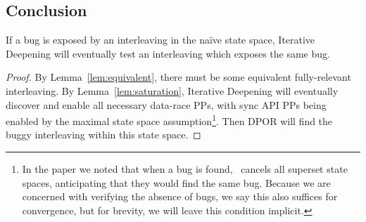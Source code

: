 
\subsection{Conclusion}

\setcounter{theorem}{1}
\begin{theorem}
	If a bug is exposed by an interleaving in the na\"{i}ve state space, Iterative Deepening will eventually test an interleaving which exposes the same bug.
\end{theorem}

\begin{proof}
By Lemma~\ref{lem:equivalent}, there must be some equivalent fully-relevant interleaving.
By Lemma~\ref{lem:saturation}, Iterative Deepening will eventually discover and enable all necessary data-race PPs, with sync API PPs being enabled by the maximal state space assumption\footnote{
		In the paper we noted that when a bug is found, \quicksand~cancels all superset state spaces, anticipating that they would find the same bug.
		Because we are concerned with verifying the absence of bugs, we say this also suffices for convergence, but for brevity, we will leave this condition implicit.}.
Then DPOR will find the buggy interleaving within this state space.
\end{proof}
